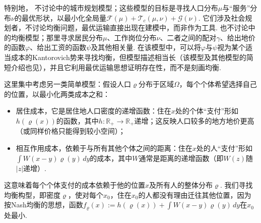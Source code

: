 特别地，\label{idx:i154-p280}
不讨论\cite{b93,b94}中的城市规划模型；这些模型的目标是寻找人口分布$\mu$与“服务”分布$\nu$的最优形状，以最小化全局量$\mathscr F(\mu)+\mathscr T_c(\mu,\nu)+\mathscr G(\nu)$. 它们涉及社会规划者，不讨论均衡问题，最优运输直接出现在建模中，而非作为工具. 也不讨论\cite{b106,b107}中的均衡模型；那里寻求居民分布$\mu$、工作岗位分布$\nu$、二者之间的配对$\gamma$、给出地价的函数$\varphi$、给出工资的函数$\psi$及其他相关量. 在该模型中，可以将$\varphi$与$\psi$视为某个适当成本的Kantorovich势来寻找均衡，但模型描述相当长（该模型及其他模型的简短介绍也见\cite{b275}），并且它利用最优运输思想证明存在性，而不是刻画均衡.

这里集中考虑另一类简单模型：假设人口$\varrho$分布于区域$\Omega$，每个个体希望选择自己的位置，以最小化两类成本之和：
\begin{itemize}
 \item 居住成本，它是居住地人口密度的递增函数：住在$x$处的个体“支付”形如$h(\varrho(x))$的函数，其中$h:\mathbb R_+\to\mathbb R_+$递增；这反映人口较多的地方地价更高（或同样价格只能得到较小空间）；
 \item {}\label{idx:i79-p281}
相互作用成本，依赖于与所有其他个体之间的距离：住在$x$处的人“支付”形如$\int W(x-y)\varrho(y)\,dy$的成本，其中$W$通常是距离的递增函数（即$W(z)$随$|z|$\mbox{递增）.}
\end{itemize}
这意味着每个个体支付的成本依赖于他的位置$x$及所有人的整体分布$\varrho$. 我们寻找均衡构型，即密度$\varrho$，使对每个$x_0$，住在$x_0$的人都没有理由迁往其他位置，因为按Nash均衡的思想，函数$f_\varrho(x):=h(\varrho(x))+\int W(x-y)\varrho(y)\,dy$在$x_0$处最小.

